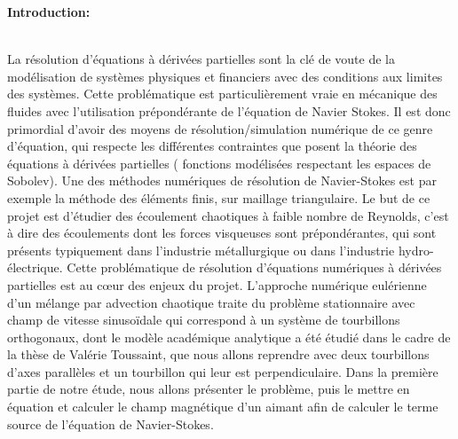 \documentclass[a4paper,12pt,titlepage]{report}
\begin{document}
\tableofcontents

\newpage




\textbf{\Huge Introduction:}
\\
\\
\begin{onehalfspace}
La résolution d'équations à dérivées partielles sont la clé de voute de la modélisation de systèmes physiques et financiers avec des conditions aux limites des systèmes. Cette problématique est particulièrement vraie en mécanique des fluides avec l'utilisation prépondérante de l'équation de Navier Stokes. Il est donc primordial d'avoir des moyens de résolution/simulation numérique de ce genre d'équation, qui respecte les différentes contraintes que posent la théorie des équations à dérivées partielles ( fonctions modélisées respectant les espaces de Sobolev). Une des méthodes numériques de résolution de Navier-Stokes est par exemple la méthode des éléments finis, sur maillage triangulaire. 
\newline
Le but de ce projet est d'étudier des écoulement chaotiques à faible nombre de Reynolds, c'est à dire des écoulements dont les forces visqueuses sont prépondérantes, qui sont présents typiquement dans l'industrie métallurgique ou dans l'industrie hydro-électrique. Cette problématique de résolution d'équations numériques à dérivées partielles est au cœur des enjeux du projet.
\newline
\newline
L'approche numérique eulérienne d'un mélange par advection chaotique traite du problème stationnaire avec champ de vitesse sinusoïdale qui correspond à un système de tourbillons orthogonaux, dont le modèle académique analytique a été étudié dans le cadre de la thèse de Valérie Toussaint, que nous allons reprendre avec deux tourbillons d'axes parallèles et un tourbillon qui leur est perpendiculaire.
Dans la première partie de notre étude, nous allons présenter le problème, puis le mettre en équation et calculer le champ magnétique d'un aimant afin de calculer le terme source de l'équation de Navier-Stokes.



\end{onehalfspace}
\end{document}
